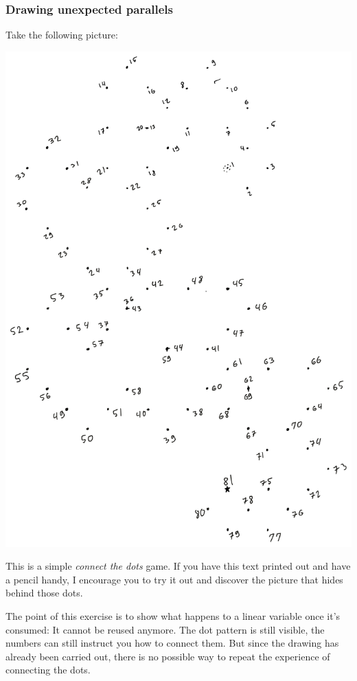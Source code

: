 \documentclass[
]{article}
\begin{document}
\hypertarget{drawing-unexpected-parallels}{%
\subsubsection{Drawing unexpected
parallels}\label{drawing-unexpected-parallels}}

Take the following picture:

\includegraphics{A1AB5AFB-31BB-4E50-ABBE-7EDE8D4CA146.png}

This is a simple \emph{connect the dots} game. If you have this text
printed out and have a pencil handy, I encourage you to try it out and
discover the picture that hides behind those dots.

The point of this exercise is to show what happens to a linear variable
once it's consumed: It cannot be reused anymore. The dot pattern is
still visible, the numbers can still instruct you how to connect them.
But since the drawing has already been carried out, there is no possible
way to repeat the experience of connecting the dots.
\end{document}
